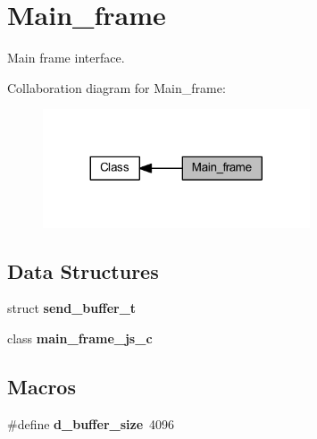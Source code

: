 \section{Main\+\_\+frame}
\label{group__main__frame}


Main frame interface.  


Collaboration diagram for Main\+\_\+frame\+:
\nopagebreak
\begin{figure}[H]
\begin{center}
\leavevmode
\includegraphics[width=224pt]{group__main__frame}
\end{center}
\end{figure}
\subsection*{Data Structures}
\begin{DoxyCompactItemize}
\item 
struct \textbf{ send\+\_\+buffer\+\_\+t}
\item 
class \textbf{ main\+\_\+frame\+\_\+js\+\_\+c}
\end{DoxyCompactItemize}
\subsection*{Macros}
\begin{DoxyCompactItemize}
\item 
\#define \textbf{ d\+\_\+buffer\+\_\+size}~4096
\end{DoxyCompactItemize}
